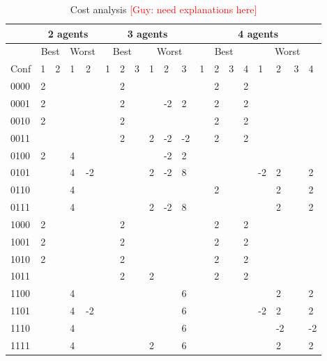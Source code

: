 \documentclass[letterpaper]{article} %
\newcommand{\guy}[1]{{\textcolor{red}{[Guy: #1]}}}
\begin{document}
{\begin{table}
\tiny
\begin{tabular}{|l||l|l||l|l||l|l|l||l|l|l||l|l|l|l||l|l|l|l|}
\hline
& \multicolumn{4}{c||}{2 agents}& \multicolumn{6}{c||}{3 agents}& \multicolumn{8}{c|}{4 agents} \\ \hline
	&	\multicolumn{2}{c|}{Best}	&			\multicolumn{2}{c||}{Worst}		&			\multicolumn{3}{c||}{Best}	&					\multicolumn{3}{c||}{Worst}		&					\multicolumn{4}{c||}{Best}			&					\multicolumn{4}{c|}{Worst}	 \\ \hline
Conf	&	1	&	2	&	1	&	2	&		1	&	2	&	3	&	1	&	2	&	3	&		1	&	2	&	3	&	4	&	1	&	2	&	3	&	4	\\ \hline
0000	&	2	&		&		&		&			&	2	&		&		&		&		&			&	2	&		&	2	&		&		&		&		\\ \hline
0001	&	2	&		&		&		&			&	2	&		&		&	-2	&	2	&			&	2	&		&	2	&		&		&		&		\\ \hline
0010	&	2	&		&		&		&			&	2	&		&		&		&		&			&	2	&		&	2	&		&		&		&		\\ \hline
0011	&		&		&		&		&			&	2	&		&	2	&	-2	&	-2	&			&	2	&		&	2	&		&		&		&		\\ \hline
0100	&	2	&		&	4	&		&			&		&		&		&	-2	&	2	&			&		&		&		&	 	&		&		&		\\ \hline
0101	&		&		&	4	&	-2	&			&		&		&	2	&	-2	&	8	&			&		&		&		&	-2	&	2	&		&	2	\\ \hline
0110	&		&		&	4	&		&			&		&		&		&		&		&			&	2	&		&		&		&	2	&		&	2	\\ \hline
0111	&		&		&	4	&		&			&		&		&	2	&	-2	&	8	&			&		&		&		&		&	2	&		&	2	\\ \hline
1000	&	2	&		&		&		&			&	2	&		&		&		&		&			&	2	&		&	2	&		&		&		&		\\ \hline
1001	&	2	&		&		&		&			&	2	&		&		&		&		&			&	2	&		&	2	&		&		&		&		\\ \hline
1010	&	2	&		&		&		&			&	2	&		&		&		&		&			&	2	&		&	2	&		&		&		&		\\ \hline
1011	&		&		&		&		&			&	2	&		&	2	&		&		&			&	2	&		&	2	&		&		&		&		\\ \hline
1100	&		&		&	4	&		&			&		&		&		&		&	6	&			&		&		&		&		&	2	&		&	2	\\ \hline
1101	&		&		&	4	&	-2	&			&		&		&		&		&	6	&			&		&		&		&	-2	&	2	&		&	2	\\ \hline
1110	&		&		&	4	&		&			&		&		&		&		&	6	&			&		&		&		&		&	-2	&		&	-2	\\ \hline
1111	&		&		&	4	&		&			&		&		&	2	&		&	6	&			&		&		&		&		&	2	&		&	2	\\ \hline
\end{tabular}
\caption{Cost analysis \guy{need explanations here}}
\label{tbl:costs}
\end{table}
}
\end{document}
